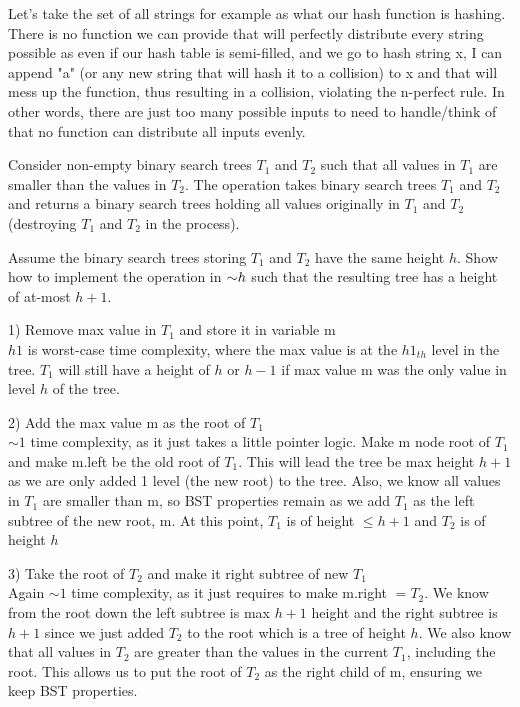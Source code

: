\begin{problem}
\begin{questions}
Let's take the set of all strings for example as what our hash function is hashing. There is no function we can provide that will perfectly distribute every string possible as even if our hash table is semi-filled, and we go to hash string x, I can append "a" (or any new string that will hash it to a collision) to x and that will mess up the function, thus resulting in a collision, violating the n-perfect rule. In other words, there are just too many possible inputs to need to handle/think of that no function can distribute all inputs evenly.


\end{questions}
\end{problem}

\begin{problem}
Consider non-empty binary search trees $T_1$ and $T_2$ such that all values in $T_1$ are smaller than the values in $T_2$. The  operation takes binary search trees $T_1$ and $T_2$ and returns a binary search trees holding all values originally in $T_1$ and $T_2$ (destroying $T_1$ and $T_2$ in the process). 
\begin{questions}
\item Assume the binary search trees storing $T_1$ and $T_2$ have the same height $h$. Show how to implement the  operation in $\mathord{\sim}h$ such that the resulting tree has a height of at-most $h+1$.

1) Remove max value in $T_1$ and store it in variable m\\
$h1$ is worst-case time complexity, where the max value is at the $h1_{th}$ level in the tree. $T_1$ will still have a height of $h$ or $h-1$ if max value m was the only value in level $h$ of the tree.

2) Add the max value m as the root of $T_1$\\
$\sim 1$ time complexity, as it just takes a little pointer logic. Make m node root of $T_1$ and make m.left be the old root of $T_1$. This will lead the tree be max height $h+1$ as we are only added 1 level (the new root) to the tree.
Also, we know all values in $T_1$ are smaller than m, so BST properties remain as we add $T_1$ as the left subtree of the new root, m.
At this point, $T_1$ is of height $ \leq h+1$ and $T_2$ is of height $h$

3) Take the root of $T_2$ and make it right subtree of new $T_1$\\
Again $\sim 1$ time complexity, as it just requires to make m.right $ = T_2$. We know from the root down the left subtree is max $h+1$ height and the right subtree is $h+1$ since we just added $T_2$ to the root which is a tree of height $h$.
We also know that all values in $T_2$ are greater than the values in the current $T_1$, including the root. This allows us to put the root of $T_2$ as the right child of m, ensuring we keep BST properties.


\end{questions}
\end{problem}

